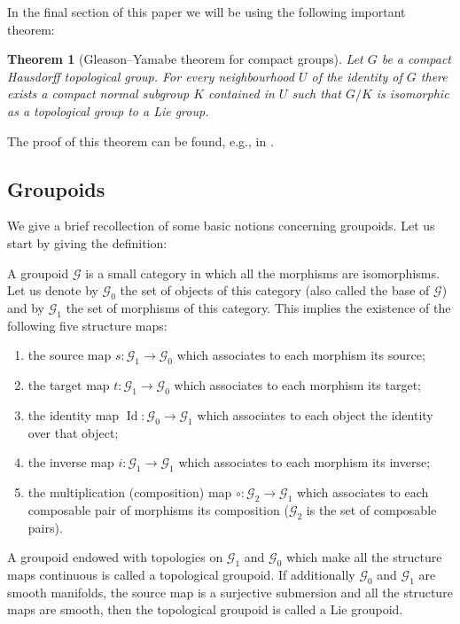 \documentclass[pdftex]{sigma}
\newtheorem{tw}{Theorem}[section]
\begin{document}
In the final section of this paper we will be using the following important theorem:
\begin{tw}[Gleason--Yamabe theorem for compact groups] \label{GY}Let $G$ be a compact Hausdorff topological group. For every neighbourhood $U$ of the identity of $G$ there exists a compact normal subgroup $K$ contained in $U$ such that $G\slash K$ is isomorphic as a topological group to a Lie group.
\end{tw}
The proof of this theorem can be found, e.g., in \cite[Theorem~1.4.14]{TT}.

\subsection{Groupoids}
We give a brief recollection of some basic notions concerning groupoids. Let us start by giving the definition:
\begin{defi} A groupoid $\mathcal{G}$ is a small category in which all the morphisms are isomorphisms. Let us denote by $\mathcal{G}_0$ the set of objects of this category (also called the base of $\mathcal{G}$) and by $\mathcal{G}_1$ the set of morphisms of this category. This implies the existence of the following five structure maps:
\begin{enumerate}\itemsep=0pt
\item[1)] the source map $s\colon \mathcal{G}_1\rightarrow\mathcal{G}_0$ which associates to each morphism its source;
\item[2)] the target map $t\colon \mathcal{G}_1\rightarrow\mathcal{G}_0$ which associates to each morphism its target;
\item[3)] the identity map $\operatorname{Id}\colon \mathcal{G}_0\rightarrow\mathcal{G}_1$ which associates to each object the identity over that object;
\item[4)] the inverse map $i\colon \mathcal{G}_1\rightarrow\mathcal{G}_1$ which associates to each morphism its inverse;
\item[5)] the multiplication (composition) map $\circ\colon \mathcal{G}_2\rightarrow\mathcal{G}_1$ which associates to each composable pair of morphisms its composition ($\mathcal{G}_2$ is the set of composable pairs).
\end{enumerate}
 A groupoid endowed with topologies on $\mathcal{G}_1$ and $\mathcal{G}_0$ which make all the structure maps continuous is called a topological groupoid. If additionally $\mathcal{G}_0$ and $\mathcal{G}_1$ are smooth manifolds, the source map is a surjective submersion and all the structure maps are smooth, then the topological groupoid is called a Lie groupoid.
\end{defi}
\end{document}
